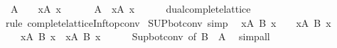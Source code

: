 \begin{isabellebody}
\ \ {\isachardoublequoteopen}{\isasymSqunion}A\ {\isacharequal}{\kern0pt}\ {\isasymbottom}\ {\isasymlongleftrightarrow}\ {\isacharparenleft}{\kern0pt}{\isasymforall}x{\isasymin}A{\isachardot}{\kern0pt}\ x\ {\isacharequal}{\kern0pt}\ {\isasymbottom}{\isacharparenright}{\kern0pt}{\isachardoublequoteclose}\isanewline
\ \ {\isachardoublequoteopen}{\isasymbottom}\ {\isacharequal}{\kern0pt}\ {\isasymSqunion}A\ {\isasymlongleftrightarrow}\ {\isacharparenleft}{\kern0pt}{\isasymforall}x{\isasymin}A{\isachardot}{\kern0pt}\ x\ {\isacharequal}{\kern0pt}\ {\isasymbottom}{\isacharparenright}{\kern0pt}{\isachardoublequoteclose}\isanewline
%
\isadelimproof
\ \ %
\endisadelimproof
%
\isatagproof
{}\isamarkupfalse%
\ dual{\isacharunderscore}{\kern0pt}complete{\isacharunderscore}{\kern0pt}lattice\isanewline
\ \ \isamarkupfalse%
\ {\isacharparenleft}{\kern0pt}rule\ complete{\isacharunderscore}{\kern0pt}lattice{\isachardot}{\kern0pt}Inf{\isacharunderscore}{\kern0pt}top{\isacharunderscore}{\kern0pt}conv{\isacharparenright}{\kern0pt}{\isacharplus}{\kern0pt}%
\endisatagproof
{\isafoldproof}%
%
\isadelimproof
\isanewline
%
\endisadelimproof
\isanewline
{}\isamarkupfalse%
\ SUP{\isacharunderscore}{\kern0pt}bot{\isacharunderscore}{\kern0pt}conv\ {\isacharbrackleft}{\kern0pt}simp{\isacharbrackright}{\kern0pt}{\isacharcolon}{\kern0pt}\isanewline
\ \ {\isachardoublequoteopen}{\isacharparenleft}{\kern0pt}{\isasymSqunion}x{\isasymin}A{\isachardot}{\kern0pt}\ B\ x{\isacharparenright}{\kern0pt}\ {\isacharequal}{\kern0pt}\ {\isasymbottom}\ {\isasymlongleftrightarrow}\ {\isacharparenleft}{\kern0pt}{\isasymforall}x{\isasymin}A{\isachardot}{\kern0pt}\ B\ x\ {\isacharequal}{\kern0pt}\ {\isasymbottom}{\isacharparenright}{\kern0pt}{\isachardoublequoteclose}\isanewline
\ \ {\isachardoublequoteopen}{\isasymbottom}\ {\isacharequal}{\kern0pt}\ {\isacharparenleft}{\kern0pt}{\isasymSqunion}x{\isasymin}A{\isachardot}{\kern0pt}\ B\ x{\isacharparenright}{\kern0pt}\ {\isasymlongleftrightarrow}\ {\isacharparenleft}{\kern0pt}{\isasymforall}x{\isasymin}A{\isachardot}{\kern0pt}\ B\ x\ {\isacharequal}{\kern0pt}\ {\isasymbottom}{\isacharparenright}{\kern0pt}{\isachardoublequoteclose}\isanewline
%
\isadelimproof
\ \ %
\endisadelimproof
%
\isatagproof
{}\isamarkupfalse%
\ Sup{\isacharunderscore}{\kern0pt}bot{\isacharunderscore}{\kern0pt}conv\ {\isacharbrackleft}{\kern0pt}of\ {\isachardoublequoteopen}B\ {\isacharbackquote}{\kern0pt}\ A{\isachardoublequoteclose}{\isacharbrackright}{\kern0pt}\ \isamarkupfalse%
\ simp{\isacharunderscore}{\kern0pt}all%

\end{isabellebody}
